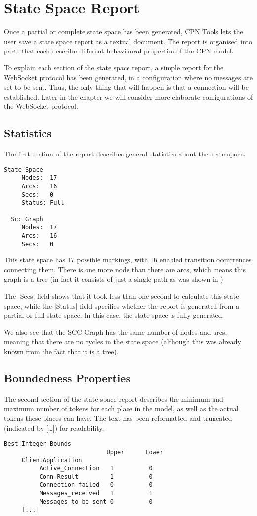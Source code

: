 \section{State Space Report}
Once a partial or complete state space has been generated, CPN Tools lets the
user save a state space report as a textual document. The report is organised
into parts that each describe different behavioural properties of the CPN model.

To explain each section of the state space report, a simple report for the
WebSocket protocol has been generated, in a configuration where no messages are
set to be sent. Thus, the only thing that will happen is that a connection will
be established. Later in the chapter we will consider more elaborate
configurations of the WebSocket protocol.
	
	\subsection{Statistics}
	The first section of the report describes general statistics about the state
	space.
	\begin{lstlisting}[language={},float]
  State Space
     Nodes:  17
     Arcs:   16
     Secs:   0
     Status: Full

  Scc Graph
     Nodes:  17
     Arcs:   16
     Secs:   0

	\end{lstlisting}
	This state space has 17 possible markings, with 16 enabled transition
	occurrences connecting them. There is one more node than there are arcs, which
	means this graph is a tree (in fact it consists of just a single path as was
	shown in )
	
	The |Secs| field shows that it took less than one second to calculate this
	state space, while the |Status| field specifies whether the report is generated
	from a partial or full state space. In this case, the state space is fully
	generated.
	
	We also see that the SCC Graph has the same number of nodes and arcs, meaning
	that there are no cycles in the state space (although this was already known
	from the fact that it is a tree).
	
	\subsection{Boundedness Properties}
	The second section of the state space report describes the minimum and maximum
	number of tokens for each place in the model, as well as the actual tokens these places can have.
	The text has been reformatted and truncated (indicated by [\ldots]) for
	readability.
	\begin{lstlisting}[language={},float]
    Best Integer Bounds
                             Upper      Lower
     ClientApplication
          Active_Connection   1          0
          Conn_Result         1          0
          Connection_failed   0          0
          Messages_received   1          1
          Messages_to_be_sent 0          0
     [...]
	\end{lstlisting}
	
